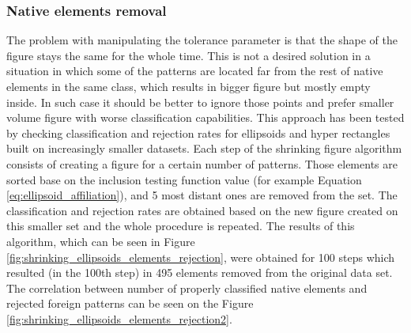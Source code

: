 \subsubsection{Native elements removal}

The problem with manipulating the tolerance parameter is that the shape of the figure stays the same for the whole time. This is not a desired solution in a situation in which some of the patterns are located far from the rest of native elements in the same class, which results in bigger figure but mostly empty inside. In such case it should be better to ignore those points and prefer smaller volume figure with worse classification capabilities. This approach has been tested by checking classification and rejection rates for ellipsoids and hyper rectangles built on increasingly smaller datasets. Each step of the shrinking figure algorithm consists of creating a figure for a certain number of patterns. Those elements are sorted base on the inclusion testing function value (for example Equation \ref{eq:ellipsoid_affiliation}), and 5 most distant ones are removed from the set. The classification and rejection rates are obtained based on the new figure created on this smaller set and the whole procedure is repeated. The results of this algorithm, which can be seen in Figure \ref{fig:shrinking_ellipsoids_elements_rejection}, were obtained for 100 steps which resulted (in the 100th step) in 495 elements removed from the original data set. The correlation between number of properly classified native elements and rejected foreign patterns can be seen on the Figure \ref{fig:shrinking_ellipsoids_elements_rejection2}.


